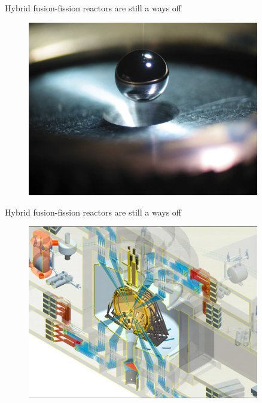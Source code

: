 \documentclass{beamer}
\begin{document}
    \begin{frame}{Hybrid fusion-fission reactors are still a ways off}
        \begin{figure}
            \centering
            \includegraphics[width=0.9\textwidth]{./img/lifeFuel.png}
            \caption*{}
        \end{figure}
    \end{frame}

    \begin{frame}{Hybrid fusion-fission reactors are still a ways off}
        \begin{figure}
            \centering
            \includegraphics[width=0.9\textwidth]{./img/lifeChamber.png}
            \caption*{}
        \end{figure}
    \end{frame}
\end{document}
